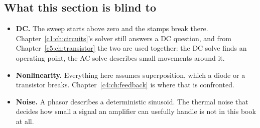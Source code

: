 \subsection{What this section is blind to}
\label{c2:sec:b6}
\begin{itemize}
  \item \textbf{DC.} The sweep starts above zero and the stamps break there. Chapter~\ref{c1:ch:circuits}'s solver still answers a DC question, and from Chapter~\ref{c5:ch:transistor} the two are used together: the DC solve finds an operating point, the AC solve describes small movements around it.
  \item \textbf{Nonlinearity.} Everything here assumes superposition, which a diode or a transistor breaks. Chapter~\ref{c4:ch:feedback} is where that is confronted.
  \item \textbf{Noise.} A phasor describes a deterministic sinusoid. The thermal noise that decides how small a signal an amplifier can usefully handle is not in this book at all.
\end{itemize}
